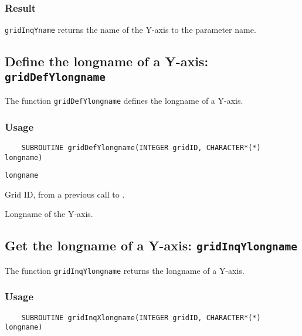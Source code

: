 \subsubsection*{Result}

{\tt gridInqYname} returns the name of the Y-axis to the parameter name.



\subsection{Define the longname of a Y-axis: {\tt gridDefYlongname}}
\label{gridDefYlongname}

The function {\tt gridDefYlongname} defines the longname of a Y-axis.

\subsubsection*{Usage}

\begin{verbatim}
    SUBROUTINE gridDefYlongname(INTEGER gridID, CHARACTER*(*) longname)
\end{verbatim}

\hspace*{4mm}\begin{minipage}[]{15cm}
\begin{deflist}{\tt longname\ }
\item[{\tt gridID}]
Grid ID, from a previous call to {}.
\item[{\tt longname}]
Longname of the Y-axis.

\end{deflist}
\end{minipage}


\subsection{Get the longname of a Y-axis: {\tt gridInqYlongname}}
\label{gridInqYlongname}

The function {\tt gridInqYlongname} returns the longname of a Y-axis.

\subsubsection*{Usage}

\begin{verbatim}
    SUBROUTINE gridInqXlongname(INTEGER gridID, CHARACTER*(*) longname)
\end{verbatim}

